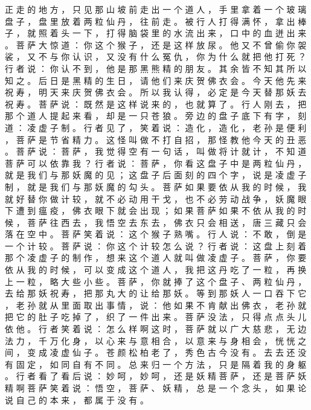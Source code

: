 {正 走 的 地 方 ， 只 见 那 山 坡 前 走 出 一 个 道 人 ， 手 里 拿 着 一 个 玻 璃 盘 子 ， 盘 里 放 着 两 粒 仙 丹 ， 往 前 走 。
被 行 人 打 得 满 怀 ， 拿 出 棒 子 ， 就 照 着 头 一 下 ， 打 得 脑 袋 里 的 水 流 出 来 ， 口 中 的 血 迸 出 来 。
菩 萨 大 惊 道 ： 你 这 个 猴 子 ， 还 是 这 样 放 尿 。
他 又 不 曾 偷 你 袈 裟 ， 又 不 与 你 认 识 ， 又 没 有 什 么 冤 仇 ， 你 为 什 么 就 把 他 打 死 ？ 行 者 说 ： 你 认 不 到 ， 他 是 那 黑 熊 精 的 朋 友 。
其 余 皆 不 知 其 所 以 知 之 。
后 日 是 黑 精 的 生 日 ， 请 他 们 来 庆 贺 佛 衣 会 。
今 天 他 先 来 祝 寿 ， 明 天 来 庆 贺 佛 衣 会 。
所 以 我 认 得 ， 必 定 是 今 天 替 那 妖 去 祝 寿 。
菩 萨 说 ： 既 然 是 这 样 说 来 的 ， 也 就 算 了 。
行 人 刚 去 ， 把 那 个 道 人 提 起 来 看 ， 却 是 一 只 苍 狼 。
旁 边 的 盘 子 底 下 有 字 ， 刻 道 ： 凌 虚 子 制 。
行 者 见 了 ， 笑 着 说 ： 造 化 ， 造 化 ， 老 孙 是 便 利 ， 菩 萨 是 节 省 精 力 。
这 怪 叫 做 不 打 自 招 ， 那 怪 教 他 今 天 的 丑 恶 。
菩 萨 说 ： 菩 萨 ， 我 觉 得 空 有 一 句 话 ， 叫 做 将 计 就 计 ， 不 知 道 菩 萨 可 以 依 靠 我 ？
行 者 说 ： 菩 萨 ， 你 看 这 盘 子 中 是 两 粒 仙 丹 ， 就 是 我 们 与 那 妖 魔 的 见 ； 这 盘 子 后 面 刻 的 四 个 字 ， 说 是 凌 虚 子 制 ， 就 是 我 们 与 那 妖 魔 的 勾 头 。
菩 萨 如 果 要 依 从 我 的 时 候 ， 我 就 好 替 你 做 计 较 ， 就 不 必 动 用 干 戈 ， 也 不 必 劳 动 战 争 ， 妖 魔 眼 下 遭 到 瘟 疫 ， 佛 衣 眼 下 就 会 出 现 ； 如 果 菩 萨 如 果 不 依 从 我 的 时 候 ， 菩 萨 往 西 去 ， 我 悟 空 去 东 去 ， 佛 衣 只 会 相 送 ， 唐 三 藏 只 会 落 在 空 中 。
菩 萨 笑 着 说 ： 这 个 猴 子 熟 嘴 。
行 人 说 ： 不 敢 ， 倒 是 一 个 计 较 。
菩 萨 说 ： 你 这 个 计 较 怎 么 说 ？ 行 者 说 ： 这 盘 上 刻 着 那 个 凌 虚 子 的 制 作 ， 想 来 这 个 道 人 就 叫 做 凌 虚 子 。
菩 萨 ， 你 要 依 从 我 的 时 候 ， 可 以 变 成 这 个 道 人 ， 我 把 这 丹 吃 了 一 粒 ， 再 换 上 一 粒 ， 略 大 些 小 些 。
菩 萨 ， 你 就 捧 了 这 个 盘 子 、 两 粒 仙 丹 ， 去 给 那 妖 祝 寿 ， 把 那 丸 大 的 让 给 那 妖 。
等 到 那 妖 人 一 口 吞 下 它 ， 老 孙 就 从 里 面 取 出 事 情 ， 说 ： 他 如 果 不 肯 献 出 佛 衣 ， 老 孙 就 把 它 的 肚 子 吃 掉 了 ， 织 了 一 件 出 来 。
菩 萨 没 法 ， 只 得 点 点 头 儿 依 他 。
行 者 笑 着 说 ： 怎 么 样 啊 这 时 ， 菩 萨 就 以 广 大 慈 悲 ， 无 边 法 力 ， 千 万 化 身 ， 以 心 来 与 意 相 合 ， 以 意 来 与 身 相 会 ， 恍 恍 之 间 ， 变 成 凌 虚 仙 子 。
苍 颜 松 柏 老 了 ， 秀 色 古 今 没 有 。
去 去 还 没 有 固 定 ， 如 同 自 有 不 同 。
总 来 归 一 个 方 法 ， 只 是 隔 着 我 的 身 躯 。
行 者 看 了 看 后 说 ： 妙 呵 ， 妙 呵 ， 还 是 妖 精 菩 萨 ， 还 是 菩 萨 妖 精 啊 菩 萨 笑 着 说 ： 悟 空 ， 菩 萨 、 妖 精 ， 总 是 一 个 念 头 ， 如 果 论 说 自 己 的 本 来 ， 都 属 于 没 有 。
}
